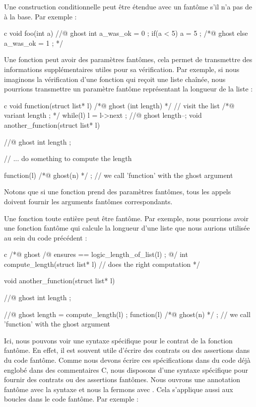 Une construction conditionnelle  peut être étendue avec un
 fantôme s'il n'a pas de  à la base. Par
exemple :


\begin{CodeBlock}{c}
void foo(int a){
  //@ ghost int a_was_ok = 0 ;
  if(a < 5){
    a = 5 ;
  } /*@ ghost else {
    a_was_ok = 1 ;
  } */
}
\end{CodeBlock}


Une fonction peut avoir des paramètres fantômes, cela permet de transmettre des
informations supplémentaires utiles pour sa vérification. Par exemple,
si nous imaginons la vérification d'une fonction qui reçoit une liste chaînée,
nous pourrions transmettre un paramètre fantôme représentant la
longueur de la liste :


\begin{CodeBlock}{c}
void function(struct list* l) /*@ ghost (int length) */ {
  // visit the list
  /*@ variant length ; */
  while(l){
    l = l->next ;
    //@ ghost length--;
  }
}
void another_function(struct list* l){
  //@ ghost int length ;

  // ... do something to compute the length

  function(l) /*@ ghost(n) */ ; // we call 'function' with the ghost argument
}
\end{CodeBlock}


Notons que si une fonction prend des paramètres fantômes, tous les appels doivent
fournir les arguments fantômes correspondants.


Une fonction toute entière peut être fantôme. Par exemple, nous pourrions avoir
une fonction fantôme qui calcule la longueur d'une liste que nous aurions utilisée
au sein du code précédent :

\begin{CodeBlock}{c}
/*@ ghost
  /@ ensures \result == logic_length_of_list(l) ; @/
  int compute_length(struct list* l){
    // does the right computation
  }
*/

void another_function(struct list* l){
  //@ ghost int length ;

  //@ ghost length = compute_length(l) ;
  function(l) /*@ ghost(n) */ ; // we call 'function' with the ghost argument
}
\end{CodeBlock}


Ici, nous pouvons voir une syntaxe spécifique pour le contrat de la fonction
fantôme. En effet, il est souvent utile d'écrire des contrats ou des assertions
dans du code fantôme. Comme nous devons écrire ces spécifications dans du code
déjà englobé dans des commentaires C, nous disposons d'une syntaxe
spécifique pour fournir des contrats ou des assertions fantômes. Nous ouvrons
une annotation fantôme avec la syntaxe  et nous la fermons avec
. Cela s'applique aussi aux boucles dans le code fantôme. Par
exemple :


